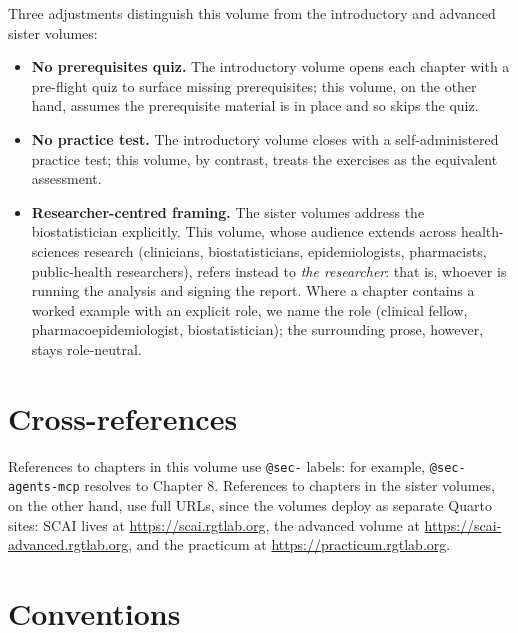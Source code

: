 \documentclass[
  letterpaper,
  11pt]{scrbook}
\providecommand{\tightlist}{%
  \setlength{\itemsep}{0pt}\setlength{\parskip}{0pt}}
\begin{document}

Three adjustments distinguish this volume from the introductory and
advanced sister volumes:

\begin{itemize}
\tightlist
\item
  \textbf{No prerequisites quiz.} The introductory volume opens each
  chapter with a pre-flight quiz to surface missing prerequisites; this
  volume, on the other hand, assumes the prerequisite material is in
  place and so skips the quiz.
\item
  \textbf{No practice test.} The introductory volume closes with a
  self-administered practice test; this volume, by contrast, treats the
  exercises as the equivalent assessment.
\item
  \textbf{Researcher-centred framing.} The sister volumes address the
  biostatistician explicitly. This volume, whose audience extends across
  health-sciences research (clinicians, biostatisticians,
  epidemiologists, pharmacists, public-health researchers), refers
  instead to \emph{the researcher}: that is, whoever is running the
  analysis and signing the report. Where a chapter contains a worked
  example with an explicit role, we name the role (clinical fellow,
  pharmacoepidemiologist, biostatistician); the surrounding prose,
  however, stays role-neutral.
\end{itemize}

\section*{Cross-references}\label{cross-references-1}


References to chapters in this volume use \texttt{@sec-} labels: for
example, \texttt{@sec-agents-mcp} resolves to Chapter 8. References to
chapters in the sister volumes, on the other hand, use full URLs, since
the volumes deploy as separate Quarto sites: SCAI lives at
\url{https://scai.rgtlab.org}, the advanced volume at
\url{https://scai-advanced.rgtlab.org}, and the practicum at
\url{https://practicum.rgtlab.org}.

\section*{Conventions}\label{conventions-1}
\end{document}

